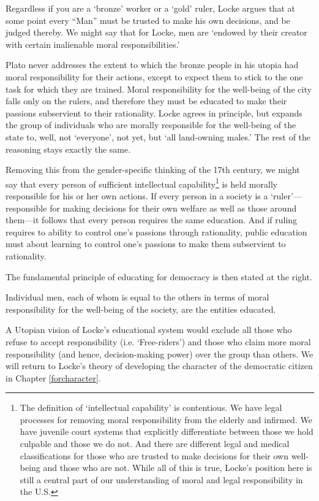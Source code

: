 Regardless if you are a `bronze' worker or a `gold' ruler, Locke argues that at some point every ``Man'' must be trusted to make his own decisions, and be judged thereby. We might say that for Locke, men are `endowed by their creator with certain inalienable moral responsibilities.'

Plato never addresses the extent to which the bronze people in his utopia had moral responsibility for their actions, except to expect them to stick to the one task for which they are trained. Moral responsibility for the well-being of the city falls only on the rulers, and therefore they must be educated to make their passions subservient to their rationality. Locke agrees in principle, but expands the group of individuals who are morally responsible for the well-being of the state to, well, not `everyone', not yet, but `all land-owning males.' The rest of the reasoning stays exactly the same.

Removing this from the gender-specific thinking of the 17th century, we might say that every person of sufficient intellectual capability\footnote{The definition of `intellectual capability' is contentious. We have legal processes for removing moral responsibility from the elderly and infirmed. We have juvenile court systems that explicitly differentiate between those we hold culpable and those we do not. And there are different legal and medical classifications for those who are trusted to make decisions for their own well-being and those who are not. While all of this is true, Locke's position here is still a central part of our understanding of moral and legal responsibility in the U.S.} is held morally responsible for his or her own actions. If every person in a society is a `ruler'---responsible for making decisions for their own welfare as well as those around them---it follows that every person requires the same education. And if ruling requires to ability to control one's passions through rationality, public education must about learning to control one's passions to make them subservient to rationality. 

The fundamental principle of educating for democracy is then stated at the right.
\begin{thesis}\label{eq:democracyLocke}
Individual men, each of whom is equal to the others in terms of moral responsibility for the well-being of the society,  are the entities educated.
\end{thesis} 

A Utopian vision of Locke's educational system would exclude all those who refuse to accept responsibility (i.e. `Free-riders') and those who claim more moral responsibility (and hence, decision-making power) over the group than others. We will return to Locke's theory of developing the character of the democratic citizen in Chapter \ref{forcharacter}. 

